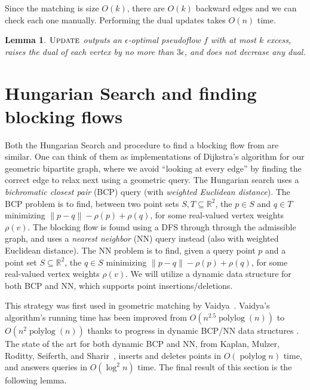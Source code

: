 \documentclass[11pt]{article}
\def\polylog{\mathop{\mathrm{polylog}}}
\def\Update{\textsc{Update}}
\theoremstyle{plain}
\newtheorem{lemma}{Lemma}
\begin{document}
Since the matching is size $O(k)$, there are $O(k)$ backward edges 
and we can check each one manually.
Performing the dual updates takes $O(n)$ time.

\begin{lemma}
\label{lemma:update_inv}
	$\Update$ outputs an $\epsilon$-optimal pseudoflow $f$ with at most $k$ excess,
	raises the dual of each vertex by no more than $3\epsilon$,
	and does not decrease any dual.
\end{lemma}


\section{Hungarian Search and finding blocking flows}
\label{section:hung_search}

Both the Hungarian Search and procedure to find a blocking flow from \cite{DBLP:conf/soda/SharathkumarA12} are similar.
One can think of them as implementations of Dijkstra's algorithm for our geometric bipartite graph,
where we avoid ``looking at every edge'' by finding the correct edge to relax next
using a geometric query. 
The Hungarian search uses a \emph{bichromatic closest pair} (BCP) query (with \emph{weighted Euclidean distance}).
The BCP problem is to find, between two point sets $S, T \subseteq \mathbb{R}^2$,
the $p \in S$ and $q \in T$ minimizing $\|p - q\| - \rho(p) + \rho(q)$,
for some real-valued vertex weights $\rho(v)$.
The blocking flow is found using a DFS through through the admissible graph,
and uses a \emph{nearest neighbor} (NN) query instead (also with weighted Euclidean distance).
The NN problem is to find, given a query point $p$ and a point set $S \subseteq \mathbb{R}^2$,
the $q \in S$ minimizing $\|p - q\| - \rho(p) + \rho(q)$,
for some real-valued vertex weights $\rho(v)$.
We will utilize a dynamic data structure for both BCP and NN, 
which supports point insertions/deletions.

This strategy was first used in geometric matching by 
Vaidya~\cite{DBLP:journals/siamcomp/Vaidya89a}.
Vaidya's algorithm's running time has been improved from $O(n^{2.5}\polylog(n))$ 
to $O(n^2 \polylog(n))$ thanks to progress in dynamic BCP/NN data structures 
\cite{DBLP:journals/siamcomp/AgarwalES99,DBLP:conf/soda/KaplanMRSS17}.
The state of the art for both dynamic BCP and NN, 
from Kaplan, Mulzer, Roditty, Seiferth, and Sharir~\cite{DBLP:conf/soda/KaplanMRSS17},
inserts and deletes points in $O(\polylog n)$ time, and answers queries in $O(\log^2 n)$ time.
The final result of this section is the following lemma.
\end{document}
